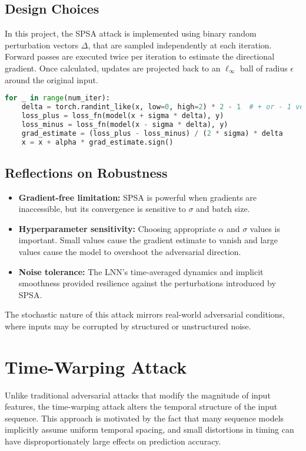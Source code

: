 \subsection*{Design Choices}
In this project, the SPSA attack is implemented using binary random perturbation vectors $\Delta$, that are sampled independently at each iteration. Forward passes are executed twice per iteration to estimate the directional gradient. Once calculated, updates are projected back to an $\ell_\infty$ ball of radius $\epsilon$ around the original input.

\begin{lstlisting}[language=Python, caption={Simplified SPSA implementation}]
for _ in range(num_iter):
    delta = torch.randint_like(x, low=0, high=2) * 2 - 1  # + or - 1 vector
    loss_plus = loss_fn(model(x + sigma * delta), y)
    loss_minus = loss_fn(model(x - sigma * delta), y)
    grad_estimate = (loss_plus - loss_minus) / (2 * sigma) * delta
    x = x + alpha * grad_estimate.sign()
\end{lstlisting}

\subsection*{Reflections on Robustness}
\begin{itemize}
    \item \textbf{Gradient-free limitation:} SPSA is powerful when gradients are inaccessible, but its convergence is sensitive to $\sigma$ and batch size.
    \item \textbf{Hyperparameter sensitivity:} Choosing appropriate $\alpha$ and $\sigma$ values is important. Small values cause the gradient estimate to vanish and large values cause the model to overshoot the adversarial direction.
    \item \textbf{Noise tolerance:} The LNN's time-averaged dynamics and implicit smoothness provided resilience against the perturbations introduced by SPSA.
\end{itemize}

The stochastic nature of this attack mirrors real-world adversarial conditions, where inputs may be corrupted by structured or unstructured noise.

\section{Time-Warping Attack}

Unlike traditional adversarial attacks that modify the magnitude of input features, the time-warping attack alters the temporal structure of the input sequence. This approach is motivated by the fact that many sequence models implicitly assume uniform temporal spacing, and small distortions in timing can have disproportionately large effects on prediction accuracy.

